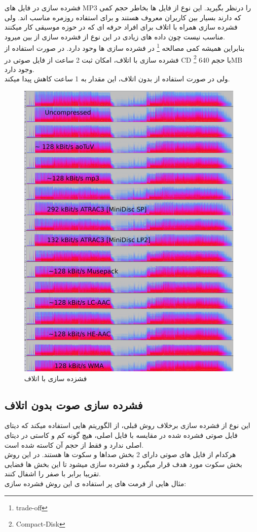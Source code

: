 فشرده سازی در فایل های MP3 را درنظر بگیرید.
این نوع از فایل ها بخاطر حجم کمی که دارند
بسیار بین کاربران معروف هستند و برای استفاده روزمره مناسب اند.
ولی فشرده سازی همراه با اتلاف برای افراد حرفه ای که در حوزه موسیقی کار میکنند
مناسب نیست چون داده های زیادی در این نوع از فشرده سازی از بین میرود.
\\
بنابراین همیشه کمی مصالحه 
\footnote{trade-off}
در فشرده سازی ها وحود دارد.
در صورت استفاده از فشرده سازی با اتلاف، امکان ثبت 
2 ساعت از 
فایل صوتی در 
CD
\footnote{Compact-Disk}
با حجم 
640MB
وجود دارد.
\\
ولی در صورت استفاده از بدون اتلاف،
این مقدار به 1 ساعت کاهش پیدا میکند.
\newline
\begin{figure}[H]
    \centering
    \includegraphics[width=0.4\linewidth]{images/Lossy.jpg}
    \caption{فشزده سازی با اتلاف}
    \label{fig:mesal2}
\end{figure}

\subsection{فشرده سازی صوت بدون اتلاف}
این نوع از فشرده سازی برخلاف روش قبلی، از الگوریتم هایی استفاده میکند که 
دیتای فایل صوتی فشرده شده در مقایسه با فایل اصلی، 
هیچ گونه کم و کاستی در دیتای اصلی ندارد و فقط از حجم آن کاسته شده است.
\\
هرکدام از فایل های صوتی دارای 2 بخش صداها و سکوت ها هستند.
در این روش بخش سکوت مورد هدف قرار میگیرد و فشرده سازی میشود تا این بخش ها فضایی تقریبا برابر با صفر را اشفال کنند.
\\
مثال هایی از فرمت های پر استفاده ی این روش فشرده سازی:

